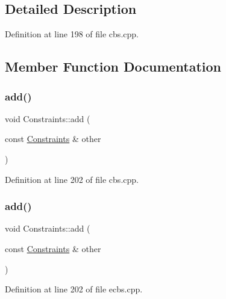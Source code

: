\subsection{Detailed Description}


Definition at line 198 of file cbs.\+cpp.



\subsection{Member Function Documentation}
\mbox{\label{struct_constraints_ad1b2c1a4ecc72e8261a5ef55ba14747b}} 
\subsubsection{\texorpdfstring{add()}{add()}\hspace{0.1cm}{\footnotesize\ttfamily [1/2]}}
{\footnotesize\ttfamily void Constraints\+::add (\begin{DoxyParamCaption}\item[{const \hyperlink{struct_constraints}{Constraints} \&}]{other }\end{DoxyParamCaption})\hspace{0.3cm}{\ttfamily [inline]}}



Definition at line 202 of file cbs.\+cpp.

\mbox{\label{struct_constraints_ad1b2c1a4ecc72e8261a5ef55ba14747b}} 
\subsubsection{\texorpdfstring{add()}{add()}\hspace{0.1cm}{\footnotesize\ttfamily [2/2]}}
{\footnotesize\ttfamily void Constraints\+::add (\begin{DoxyParamCaption}\item[{const \hyperlink{struct_constraints}{Constraints} \&}]{other }\end{DoxyParamCaption})\hspace{0.3cm}{\ttfamily [inline]}}



Definition at line 202 of file ecbs.\+cpp.


